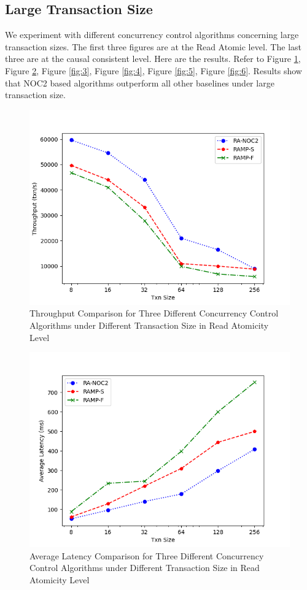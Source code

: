 \subsection{Large Transaction Size}
We experiment with different concurrency control algorithms concerning large transaction sizes. The first three figures are at the Read Atomic level. The last three are at the causal consistent level.
 Here are the results. Refer to Figure \ref{fig:1}, Figure \ref{fig:2}, Figure \ref{fig:3}, Figure \ref{fig:4}, Figure \ref{fig:5}, Figure \ref{fig:6}. Results show that NOC2 based algorithms outperform all other baselines under large transaction size.
\begin{figure}
    \centering
    \includegraphics[width=0.8\linewidth]{figure/1-ra-t.png}
    \caption{Throughput Comparison for Three Different Concurrency Control Algorithms under Different Transaction Size in Read Atomicity Level}
    \label{fig:1}
\end{figure}



\begin{figure}
    \centering
    \includegraphics[width=0.8\linewidth]{figure/1-ra-al.png}
    \caption{Average Latency Comparison for Three Different Concurrency Control Algorithms under Different Transaction Size in Read Atomicity Level}
    \label{fig:2}
\end{figure}



